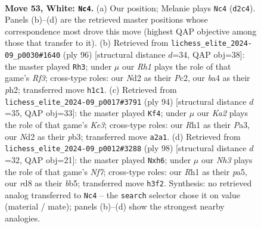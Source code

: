 \documentclass[11pt]{article}
\begin{document}
\clearpage

\begin{figure}[p]\centering
\begin{subfigure}{0.46\textwidth}\centering
\resizebox{\linewidth}{!}{%
\newchessgame
\chessboard[
  setfen={3r4/6k1/1p6/p1p1r3/b7/2P3PN/K2N1p1P/7R w - - 2 53},
  showmover=false,
  pgfstyle=straightmove, color=movearrow, markmove={d2-c4}
]}
\caption{}
\end{subfigure}\hfill
\begin{subfigure}{0.46\textwidth}\centering
\resizebox{\linewidth}{!}{%
\newchessgame
\chessboard[
  setfen={6k1/8/p2pN3/1p2b1p1/1P6/P4R2/2P1r2p/1K6 w - - 0 49},
  showmover=false,
  pgfstyle=straightmove, color=movearrow, markmove={f3-h3}
]}
\caption{}
\end{subfigure}
\\[4pt]
\begin{subfigure}{0.46\textwidth}\centering
\resizebox{\linewidth}{!}{%
\newchessgame
\chessboard[
  setfen={1r4k1/8/5RP1/3pP2p/p1pP4/PpN1K2P/8/8 w - - 3 48},
  showmover=false,
  pgfstyle=straightmove, color=movearrow, markmove={e3-f4}
]}
\caption{}
\end{subfigure}\hfill
\begin{subfigure}{0.46\textwidth}\centering
\resizebox{\linewidth}{!}{%
\newchessgame
\chessboard[
  setfen={k7/4RN2/2p4p/pbPp4/3P2P1/2P5/6K1/8 w - - 0 50},
  showmover=false,
  pgfstyle=straightmove, color=movearrow, markmove={f7-h6}
]}
\caption{}
\end{subfigure}
\caption{\textbf{Move 53, White: \texttt{Nc4}.} (a) Our position; Melanie plays \texttt{Nc4} (\texttt{d2c4}). Panels (b)--(d) are the retrieved master positions whose correspondence most drove this move (highest QAP objective among those that transfer to it). (b) Retrieved from \texttt{lichess\_elite\_2024-09\_p0030\#1640} (ply 96) [structural distance $d$=34, QAP obj=38]: the master played \texttt{Rh3}; under $\mu$ our \emph{Rh1} plays the role of that game's \emph{Rf3}; cross-type roles: our \emph{N}d2 as their \emph{P}c2, our \emph{b}a4 as their \emph{p}h2; transferred move \texttt{h1c1}. (c) Retrieved from \texttt{lichess\_elite\_2024-09\_p0017\#3791} (ply 94) [structural distance $d$=35, QAP obj=33]: the master played \texttt{Kf4}; under $\mu$ our \emph{Ka2} plays the role of that game's \emph{Ke3}; cross-type roles: our \emph{R}h1 as their \emph{P}a3, our \emph{N}d2 as their \emph{p}b3; transferred move \texttt{a2a1}. (d) Retrieved from \texttt{lichess\_elite\_2024-09\_p0012\#3288} (ply 98) [structural distance $d$=32, QAP obj=21]: the master played \texttt{Nxh6}; under $\mu$ our \emph{Nh3} plays the role of that game's \emph{Nf7}; cross-type roles: our \emph{R}h1 as their \emph{p}a5, our \emph{r}d8 as their \emph{b}b5; transferred move \texttt{h3f2}. Synthesis: no retrieved analog transferred to \texttt{Nc4} -- the \texttt{search} selector chose it on value (material / mate); panels (b)--(d) show the strongest nearby analogies.}
\label{fig:thought-m104}
\end{figure}
\end{document}
